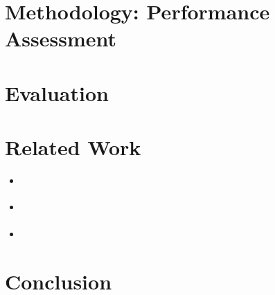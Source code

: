 \documentclass[
	12pt,
	a4paper,
	oneside,
	openright,
	listof=totoc%
]{scrbook}
\begin{document}
\chapter{Methodology: Performance Assessment}


\chapter{Evaluation} \label{chapter:6}


\chapter{Related Work}
\begin{itemize}
  \item \cite{hindle_green_2015}
  \item \cite{german_visualizing_2006}
  \item \cite{shang_exploratory_2011}
\end{itemize}
\chapter{Conclusion}

\clearpage


\end{document}
